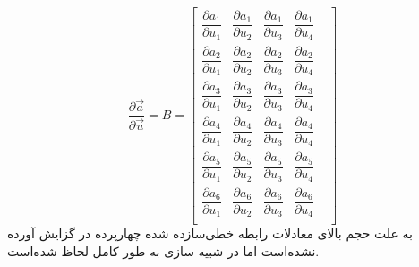 \begin{equation}
	\dfrac{\partial \vec a}{\partial \vec u} = B = 
	\begin{bmatrix}
		\dfrac{\partial  a_1}{\partial  u_1}&
		\dfrac{\partial  a_1}{\partial  u_2}&
		\dfrac{\partial  a_1}{\partial  u_3}&
		\dfrac{\partial  a_1}{\partial  u_4}&
		\\[1em]
		\dfrac{\partial  a_2}{\partial  u_1}&
		\dfrac{\partial  a_2}{\partial  u_2}&
		\dfrac{\partial  a_2}{\partial  u_3}&
		\dfrac{\partial  a_2}{\partial  u_4}&
		\\[1em]
		\dfrac{\partial  a_3}{\partial  u_1}&
		\dfrac{\partial  a_3}{\partial  u_2}&
		\dfrac{\partial  a_3}{\partial  u_3}&
		\dfrac{\partial  a_3}{\partial  u_4}&
		\\[1em]
		\dfrac{\partial  a_4}{\partial  u_1}&
		\dfrac{\partial  a_4}{\partial  u_2}&
		\dfrac{\partial  a_4}{\partial  u_3}&
		\dfrac{\partial  a_4}{\partial  u_4}&
		\\[1em]
		\dfrac{\partial  a_5}{\partial  u_1}&
		\dfrac{\partial  a_5}{\partial  u_2}&
		\dfrac{\partial  a_5}{\partial  u_3}&
		\dfrac{\partial  a_5}{\partial  u_4}&
		\\[1em]
		\dfrac{\partial  a_6}{\partial  u_1}&
		\dfrac{\partial  a_6}{\partial  u_2}&
		\dfrac{\partial  a_6}{\partial  u_3}&
		\dfrac{\partial  a_6}{\partial  u_4}&
		\\[1em]
	\end{bmatrix}
\end{equation}
به علت حجم بالای معادلات رابطه خطی‌سازده شده چهارپرده در گزایش آورده نشده‌است اما در شبیه سازی به طور کامل لحاظ شده‌است.
